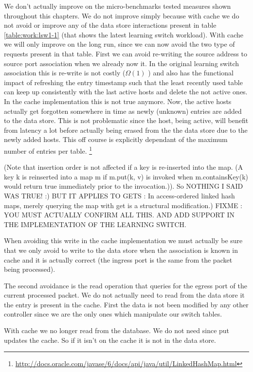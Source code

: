 We don't actually improve on the micro-benchmarks tested measures
shown throughout this chapters. We do not improve simply because with
cache we do not avoid or improve any of the data store interactions
present in table \ref{table:work:lsw1-1} (that shows the latest
learning switch workload).  With cache we will only improve on the
long run, since we can now avoid the two type of requests present in
that table. First we can avoid re-writing the source address to source
port association when we already now it. In the original learning
switch association this is re-write is not costly ($\Omega(1)$ ) and also
has the functional impact of refreshing the entry timestamp such that
the least recently used table can keep up consistently with the last
active hosts and delete the not active ones. In the cache
implementation this is not true anymore. Now, the active hosts
actually get forgotten somewhere in time as newly (unknown) entries
are added to the data store. This is not problematic since the host,
being active, will benefit from latency a lot before actually being
erased from the  the data store due to the newly added hosts. This off
course is explicitly dependant of the maximum number of entries per
table. 
\footnote{\url{http://docs.oracle.com/javase/6/docs/api/java/util/LinkedHashMap.html}}

(Note that insertion order is not affected if a key is re-inserted
into the map. (A key k is reinserted into a map m if m.put(k, v) is
invoked when m.containsKey(k) would return true immediately prior to
the invocation.)).  So NOTHING I SAID WAS TRUE! :) BUT IT APPLIES TO
GETS : In access-ordered linked hash maps, merely querying the map
with get is a structural modification.)
FIXME : YOU MUST ACTUALLY CONFIRM ALL THIS. AND ADD SUPPORT IN THE
IMPLEMENTATION OF THE LEARNING SWITCH. 

When avoiding this write
in the cache implementation we must actually be sure that we only
avoid to write to the data store when the association is known in
cache and it is actually correct (the ingress port is the same from
the packet being processed). 

The second avoidance is the read operation that queries for the egress
port of the current processed packet. We do not actually need to read
from the data store it the entry is present in the cache. First the
data is not been modified by any other controller since we are the only
ones which manipulate our switch tables. 


With cache we no longer read from the database. We do not need since
put updates the cache. So if it isn't on the cache it is not in the
data store.



